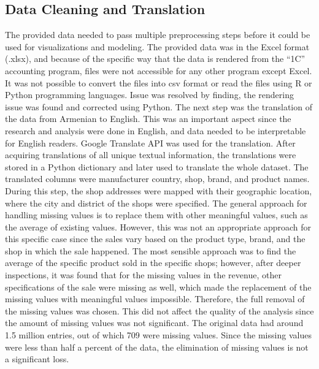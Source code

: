 \documentclass[conference]{IEEEtran}
\begin{document}
\subsection{Data Cleaning and Translation}
The provided data needed to pass multiple preprocessing steps before it could be used for visualizations and modeling. The provided data was in the Excel format (.xlsx), and because of the specific way that the data is rendered from the “1C” accounting program, files were not accessible for any other program except Excel.
It was not possible to convert the files into csv format or read the files using R or Python programming languages. Issue was resolved by finding, the rendering issue was found and corrected using Python. 
The next step was the translation of the data from Armenian to English. This was an important aspect since the research and analysis were done in English, and data needed to be interpretable for English readers. Google Translate API was used for the translation. After acquiring translations of all unique textual information, the translations were stored in a Python dictionary and later used to translate the whole dataset. The translated columns were manufacturer country, shop, brand, and product names. During this step, the shop addresses were mapped with their geographic location, where the city and district of the shops were specified. 
The general approach for handling missing values is to replace them with other meaningful values, such as the average of existing values. However, this was not an appropriate approach for this specific case since the sales vary based on the product type, brand, and the shop in which the sale happened. The most sensible approach was to find the average of the specific product sold in the specific shops; however, after deeper inspections, it was found that for the missing values in the revenue, other specifications of the sale were missing as well, which made the replacement of the missing values with meaningful values impossible. Therefore, the full removal of the missing values was chosen. This did not affect the quality of the analysis since the amount of missing values was not significant. The original data had around 1.5 million entries, out of which 709 were missing values. Since the missing values were less than half a percent of the data, the elimination of missing values is not a significant loss.

\end{document}
